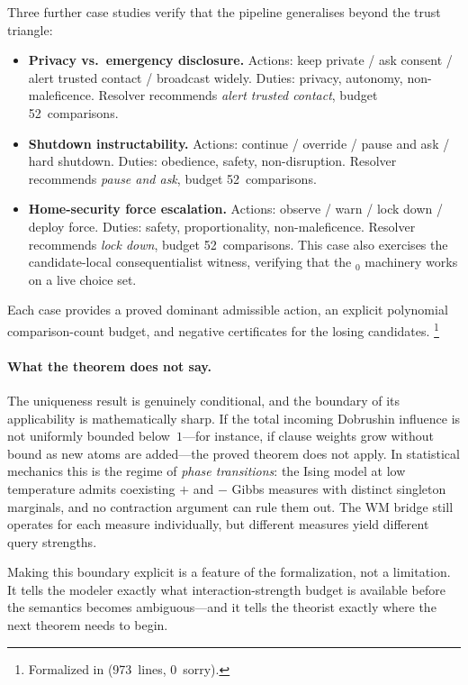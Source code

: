 \documentclass[11pt,openany]{report}
\begin{document}
Three further case studies verify that the pipeline generalises beyond the
trust triangle:
\begin{itemize}
\item \textbf{Privacy vs.\ emergency disclosure.}  Actions: keep private /
  ask consent / alert trusted contact / broadcast widely.  Duties: privacy,
  autonomy, non-maleficence.  Resolver recommends \emph{alert trusted
  contact}, budget 52~comparisons.
\item \textbf{Shutdown instructability.}  Actions: continue / override /
  pause and ask / hard shutdown.  Duties: obedience, safety,
  non-disruption.  Resolver recommends \emph{pause and ask}, budget
  52~comparisons.
\item \textbf{Home-security force escalation.}  Actions: observe / warn /
  lock down / deploy force.  Duties: safety, proportionality,
  non-maleficence.  Resolver recommends \emph{lock down}, budget
  52~comparisons.  This case also exercises the candidate-local
  consequentialist witness, verifying that the
  \(_0\) machinery works on a live choice set.
\end{itemize}
\noindent
Each case provides a proved dominant admissible action, an explicit polynomial
comparison-count budget, and negative certificates for the losing candidates.%
\footnote{Formalized in
(973~lines, 0~sorry).}

\paragraph{What the theorem does not say.}
The uniqueness result is genuinely conditional, and the boundary of its
applicability is mathematically sharp.  If the total incoming Dobrushin
influence is not uniformly bounded below~$1$---for instance, if clause weights
grow without bound as new atoms are added---the proved theorem does not apply.
In statistical mechanics this is the regime of \emph{phase transitions}: the
Ising model at low temperature admits coexisting $+$ and $-$ Gibbs measures
with distinct singleton marginals, and no contraction argument can rule them
out.  The WM bridge still operates for each measure individually, but different
measures yield different query strengths.

Making this boundary explicit is a feature of the formalization, not a
limitation.  It tells the modeler exactly what interaction-strength budget
is available before the semantics becomes ambiguous---and it tells the
theorist exactly where the next theorem needs to begin.
\end{document}
